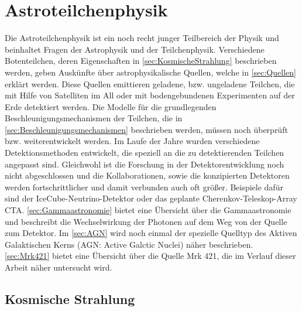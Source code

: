 \chapter{Astroteilchenphysik}
\label{chapter:Astroteilchenphysik}
Die Astroteilchenphysik ist ein noch recht junger Teilbereich der Physik und beinhaltet Fragen der Astrophysik und der Teilchenphysik.
Verschiedene Botenteilchen, deren Eigenschaften in \autoref{sec:KosmischeStrahlung} beschrieben werden, geben Auskünfte über astrophysikalische Quellen, welche in \autoref{sec:Quellen} erklärt werden.
Diese Quellen emittieren geladene, bzw.  ungeladene Teilchen, die mit Hilfe von Satelliten im All oder mit bodengebundenen Experimenten auf der Erde detektiert werden.
Die Modelle für die grundlegenden Beschleunigungsmechanismen der Teilchen, die in \autoref{sec:Beschleunigungsmechanismen} beschrieben werden, müssen noch überprüft bzw. weiterentwickelt werden.
Im Laufe der Jahre wurden verschiedene Detektionsmethoden entwickelt, die speziell an die zu detektierenden Teilchen angepasst sind.
Gleichwohl ist die Forschung in der Detektorentwicklung noch nicht abgeschlossen und die Kollaborationen, sowie die konzipierten Detektoren werden fortschrittlicher und damit verbunden auch oft größer.
Beispiele dafür sind der IceCube-Neutrino-Detektor oder das geplante Cherenkov-Teleskop-Array CTA.
\autoref{sec:Gammaastronomie} bietet eine Übersicht über die Gammaastronomie und beschreibt die Wechselwirkung der Photonen auf dem Weg von der Quelle zum Detektor. 
Im \autoref{sec:AGN} wird noch einmal der spezielle Quelltyp des Aktiven Galaktischen Kerns (AGN: Active Galctic Nuclei) näher beschrieben.
\autoref{sec:Mrk421} bietet eine Übersicht über die Quelle Mrk 421, die im Verlauf dieser Arbeit näher untersucht wird.

\section{Kosmische Strahlung}
\label{sec:KosmischeStrahlung}

